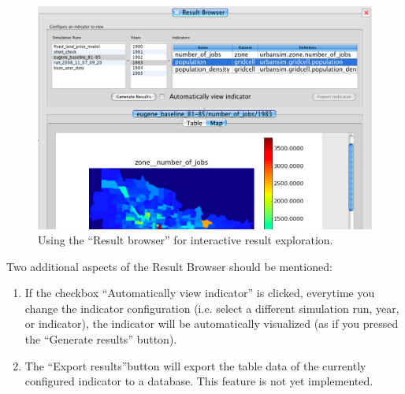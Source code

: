 \begin{figure}[htp]
\begin{center}
\includegraphics[width=1.0\textwidth]{part-gui/images/result-manager-result-browser.png}
\end{center}
\caption{Using the ``Result browser'' for interactive result
exploration.}
\label{fig:results-manager-result-browser}
\end{figure}


Two additional aspects of the Result Browser should be mentioned:
\begin{enumerate}
  \item If the checkbox ``Automatically view indicator'' is
  clicked, everytime you change the indicator configuration (i.e.
  select a different simulation run, year, or indicator), the
  indicator will be automatically visualized (as if you pressed the
  ``Generate results'' button). 
  \item The ``Export results''button will export the table data
  of the currently configured indicator to a database. This feature
  is not yet implemented. 
\end{enumerate}

